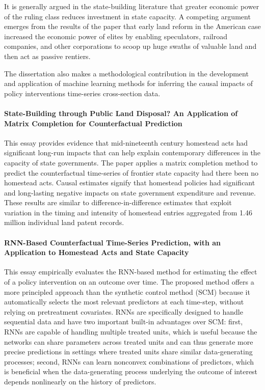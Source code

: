 It is generally argued in the state-building literature that greater economic power of the ruling class reduces investment in state capacity. A competing argument emerges from the results of the paper that early land reform in the American case increased the economic power of elites by enabling speculators, railroad companies, and other corporations to scoop up huge swaths of valuable land and then act as passive rentiers.

The dissertation also makes a methodological contribution in the development and application of machine learning methods for inferring the causal impacts of policy interventions time-series cross-section data. 

\paragraph*{State-Building through Public Land Disposal? An Application of Matrix Completion for Counterfactual Prediction}
This essay provides evidence that mid-nineteenth century homestead acts had significant long-run impacts that can help explain contemporary differences in the capacity of state governments. The paper applies a matrix completion method to predict the counterfactual time-series of frontier state capacity had there been no homestead acts. Causal estimates signify that homestead policies had significant and long-lasting negative impacts on state government expenditure and revenue. These results are similar to difference-in-difference estimates that exploit variation in the timing and intensity of homestead entries aggregated from 1.46 million individual land patent records.

\paragraph*{RNN-Based Counterfactual Time-Series Prediction, with an Application to Homestead Acts and State Capacity}
This essay empirically evaluates the RNN-based method for estimating the effect of a policy intervention on an outcome over time. The proposed method offers a more principled approach than the synthetic control method (SCM) because it automatically selects the most relevant predictors at each time-step, without relying on pretreatment covariates. RNNs are specifically designed to handle sequential data and have two important built-in advantages over SCM: first, RNNs are capable of handling multiple treated units, which is useful because the networks can share parameters across treated units and can thus generate more precise predictions in settings where treated units share similar data-generating processes; second, RNNs can learn nonconvex combinations of predictors, which is beneficial when the data-generating process underlying the outcome of interest depends nonlinearly on the history of predictors.

